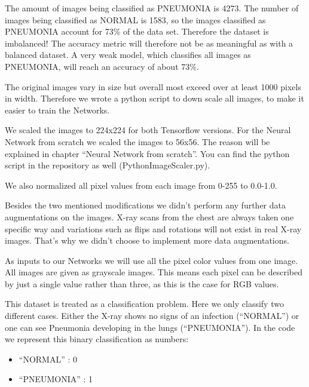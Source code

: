 \documentclass{article}
\begin{document}
The amount of images being classified as PNEUMONIA is 4273. 
The number of images being classified as NORMAL is 1583, 
so the images classified as PNEUMONIA account for 73\% of the data set. 
Therefore the dataset is imbalanced! The accuracy metric will therefore not be as meaningful as with a balanced dataset.
A very weak model, which classifies all images as PNEUMONIA, will reach an accuracy of about 73\%.

The original images vary in size but overall most exceed over at least 1000 pixels in width. 
Therefore we wrote a python script to down scale all images, to make it easier to train the Networks.

We scaled the images to 224x224 for both Tensorflow versions. 
For the Neural Network from scratch we scaled the images to 56x56. 
The reason will be explained in chapter ``Neural Network from scratch''.
You can find the python script in the repository as well (PythonImageScaler.py).

We also normalized all pixel values from each image from 0-255 to 0.0-1.0.

Besides the two mentioned modifications we didn't perform any further data augmentations on the images. 
X-ray scans from the chest are always taken one specific way and variations such as flips and rotations will 
not exist in real X-ray images. That's why we didn't choose to implement more data augmentations.

As inputs to our Networks we will use all the pixel color values from one image. 
All images are given as grayscale images. This means each pixel can be described by just a 
single value rather than three, as this is the case for RGB values.

This dataset is treated as a classification problem. Here we only classify two different cases. 
Either the X-ray shows no signs of an infection (``NORMAL'') or one can see Pneumonia 
developing in the lungs (``PNEUMONIA''). In the code we represent this binary classification as numbers:

\begin{itemize}
  \item ``NORMAL'' : 0
  \item ``PNEUMONIA'' : 1
\end{itemize}
\end{document}
